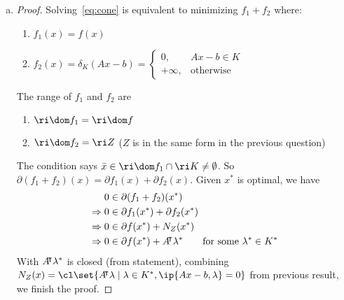 \documentclass{article}
\begin{document}
\begin{solution}
\begin{enumerate}[(a)]
{\begin{proof}
                We conclude that
                \[ \text{ri}\, Z \supseteq \{x \in \mathbb{R}^n \mid Ax - b \in \text{ri}\, K\}. \]
            \end{proof}
        }
        \item {
            \begin{proof}
                Solving~\cref{eq:cone} is equivalent to minimizing $f_1+f_2$ where:
                \begin{enumerate}
                    \item $f_1(x)=f(x)$
                    \item $f_2(x)=\delta_K(Ax-b)=\begin{cases}
                        0, & Ax-b\in K \\
                        +\infty, & \text{otherwise}
                    \end{cases}$
                \end{enumerate}
                The range of $f_1$ and $f_2$ are
                \begin{enumerate}
                    \item $\ri\dom f_1=\ri\dom f$
                    \item $\ri\dom f_2=\ri Z$ ($Z$ is in the same form in the previous question)
                \end{enumerate}
                The condition says $\bar{x}\in\ri\dom f_1\cap\ri K\neq\emptyset$. So $\partial(f_1+f_2)(x)=\partial f_1(x)+\partial f_2(x)$. Given $x^*$ is optimal, we have
                \begin{align*}
                    0& \in\partial(f_1+f_2)(x^*) \\
                    \Rightarrow
                    0& \in\partial f_1(x^*)+\partial f_2(x^*) \\
                    \Rightarrow
                    0& \in\partial f(x^*)+N_Z(x^*) \\
                    \Rightarrow
                    0& \in\partial f(x^*)+A{}^{\mkern-4mu\intercal}\lambda^* \qquad \text{for some }\lambda^*\in K^*
                \end{align*}
                With $A{}^{\mkern-4mu\intercal}\lambda^*$ is closed (from statement), combining $N_Z(x)=\cl\set{A\trn\lambda\mid\lambda\in K^*,\ip{Ax-b,\lambda}=0}$ from previous result, we finish the proof.
            \end{proof}
        }
    \end{enumerate}
\end{solution}
\end{document}
